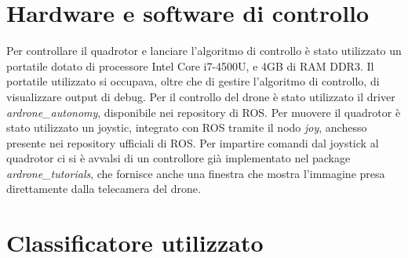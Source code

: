 \section{Hardware e software di controllo}
Per controllare il quadrotor e lanciare l'algoritmo di controllo è stato utilizzato un portatile dotato di processore Intel Core i7-4500U, e 4GB di RAM DDR3.
Il portatile utilizzato si occupava, oltre che di gestire l'algoritmo di controllo, di visualizzare output di debug.
Per il controllo del drone è stato utilizzato il driver \textit{ardrone\_autonomy}, disponibile nei repository di ROS.
Per muovere il quadrotor è stato utilizzato un joystic, integrato con ROS tramite il nodo \textit{joy}, anchesso presente nei repository ufficiali di ROS.
Per impartire comandi dal joystick al quadrotor ci si è avvalsi di un controllore già implementato nel package  \textit{ardrone\_tutorials}, che fornisce anche una finestra che mostra l'immagine presa direttamente dalla telecamera del drone.

\section{Classificatore utilizzato}


